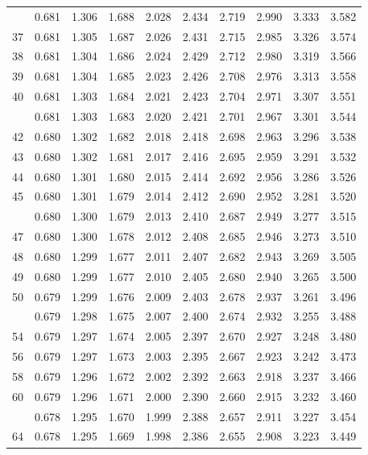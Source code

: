 \documentclass[10pt]{article}
\begin{document}
\begin{center}
\begin{longtable}{@{}r!{\vrule width 0.8pt\hspace{0.65em}}rrrrrrrrr@{}}
 & 0.681 & 1.306 & 1.688 & 2.028 & 2.434 & 2.719 & 2.990 & 3.333 & 3.582 \\
37 & 0.681 & 1.305 & 1.687 & 2.026 & 2.431 & 2.715 & 2.985 & 3.326 & 3.574 \\
38 & 0.681 & 1.304 & 1.686 & 2.024 & 2.429 & 2.712 & 2.980 & 3.319 & 3.566 \\
39 & 0.681 & 1.304 & 1.685 & 2.023 & 2.426 & 2.708 & 2.976 & 3.313 & 3.558 \\
40 & 0.681 & 1.303 & 1.684 & 2.021 & 2.423 & 2.704 & 2.971 & 3.307 & 3.551 \\
 & 0.681 & 1.303 & 1.683 & 2.020 & 2.421 & 2.701 & 2.967 & 3.301 & 3.544 \\
42 & 0.680 & 1.302 & 1.682 & 2.018 & 2.418 & 2.698 & 2.963 & 3.296 & 3.538 \\
43 & 0.680 & 1.302 & 1.681 & 2.017 & 2.416 & 2.695 & 2.959 & 3.291 & 3.532 \\
44 & 0.680 & 1.301 & 1.680 & 2.015 & 2.414 & 2.692 & 2.956 & 3.286 & 3.526 \\
45 & 0.680 & 1.301 & 1.679 & 2.014 & 2.412 & 2.690 & 2.952 & 3.281 & 3.520 \\
 & 0.680 & 1.300 & 1.679 & 2.013 & 2.410 & 2.687 & 2.949 & 3.277 & 3.515 \\
47 & 0.680 & 1.300 & 1.678 & 2.012 & 2.408 & 2.685 & 2.946 & 3.273 & 3.510 \\
48 & 0.680 & 1.299 & 1.677 & 2.011 & 2.407 & 2.682 & 2.943 & 3.269 & 3.505 \\
49 & 0.680 & 1.299 & 1.677 & 2.010 & 2.405 & 2.680 & 2.940 & 3.265 & 3.500 \\
50 & 0.679 & 1.299 & 1.676 & 2.009 & 2.403 & 2.678 & 2.937 & 3.261 & 3.496 \\
 & 0.679 & 1.298 & 1.675 & 2.007 & 2.400 & 2.674 & 2.932 & 3.255 & 3.488 \\
54 & 0.679 & 1.297 & 1.674 & 2.005 & 2.397 & 2.670 & 2.927 & 3.248 & 3.480 \\
56 & 0.679 & 1.297 & 1.673 & 2.003 & 2.395 & 2.667 & 2.923 & 3.242 & 3.473 \\
58 & 0.679 & 1.296 & 1.672 & 2.002 & 2.392 & 2.663 & 2.918 & 3.237 & 3.466 \\
60 & 0.679 & 1.296 & 1.671 & 2.000 & 2.390 & 2.660 & 2.915 & 3.232 & 3.460 \\
 & 0.678 & 1.295 & 1.670 & 1.999 & 2.388 & 2.657 & 2.911 & 3.227 & 3.454 \\
64 & 0.678 & 1.295 & 1.669 & 1.998 & 2.386 & 2.655 & 2.908 & 3.223 & 3.449 \\

\end{longtable}
\end{center}
\end{document}
